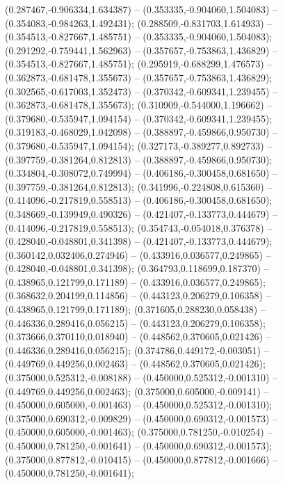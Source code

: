  (0.287467,-0.906334,1.634387) -- (0.353335,-0.904060,1.504083) -- (0.354083,-0.984263,1.492431);
 (0.288509,-0.831703,1.614933) -- (0.354513,-0.827667,1.485751) -- (0.353335,-0.904060,1.504083);
 (0.291292,-0.759441,1.562963) -- (0.357657,-0.753863,1.436829) -- (0.354513,-0.827667,1.485751);
 (0.295919,-0.688299,1.476573) -- (0.362873,-0.681478,1.355673) -- (0.357657,-0.753863,1.436829);
 (0.302565,-0.617003,1.352473) -- (0.370342,-0.609341,1.239455) -- (0.362873,-0.681478,1.355673);
 (0.310909,-0.544000,1.196662) -- (0.379680,-0.535947,1.094154) -- (0.370342,-0.609341,1.239455);
 (0.319183,-0.468029,1.042098) -- (0.388897,-0.459866,0.950730) -- (0.379680,-0.535947,1.094154);
 (0.327173,-0.389277,0.892733) -- (0.397759,-0.381264,0.812813) -- (0.388897,-0.459866,0.950730);
 (0.334804,-0.308072,0.749994) -- (0.406186,-0.300458,0.681650) -- (0.397759,-0.381264,0.812813);
 (0.341996,-0.224808,0.615360) -- (0.414096,-0.217819,0.558513) -- (0.406186,-0.300458,0.681650);
 (0.348669,-0.139949,0.490326) -- (0.421407,-0.133773,0.444679) -- (0.414096,-0.217819,0.558513);
 (0.354743,-0.054018,0.376378) -- (0.428040,-0.048801,0.341398) -- (0.421407,-0.133773,0.444679);
 (0.360142,0.032406,0.274946) -- (0.433916,0.036577,0.249865) -- (0.428040,-0.048801,0.341398);
 (0.364793,0.118699,0.187370) -- (0.438965,0.121799,0.171189) -- (0.433916,0.036577,0.249865);
 (0.368632,0.204199,0.114856) -- (0.443123,0.206279,0.106358) -- (0.438965,0.121799,0.171189);
 (0.371605,0.288230,0.058438) -- (0.446336,0.289416,0.056215) -- (0.443123,0.206279,0.106358);
 (0.373666,0.370110,0.018940) -- (0.448562,0.370605,0.021426) -- (0.446336,0.289416,0.056215);
 (0.374786,0.449172,-0.003051) -- (0.449769,0.449256,0.002463) -- (0.448562,0.370605,0.021426);
 (0.375000,0.525312,-0.008188) -- (0.450000,0.525312,-0.001310) -- (0.449769,0.449256,0.002463);
 (0.375000,0.605000,-0.009141) -- (0.450000,0.605000,-0.001463) -- (0.450000,0.525312,-0.001310);
 (0.375000,0.690312,-0.009829) -- (0.450000,0.690312,-0.001573) -- (0.450000,0.605000,-0.001463);
 (0.375000,0.781250,-0.010254) -- (0.450000,0.781250,-0.001641) -- (0.450000,0.690312,-0.001573);
 (0.375000,0.877812,-0.010415) -- (0.450000,0.877812,-0.001666) -- (0.450000,0.781250,-0.001641);
